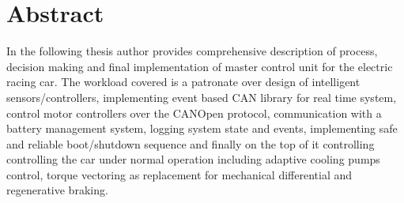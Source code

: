 






\chapter{Abstract}

In the following thesis author provides comprehensive description of process, decision making and final implementation of master control unit for the electric racing car. The workload covered is a patronate over design of intelligent sensors/controllers, implementing event based CAN library for real time system, control motor controllers over the CANOpen protocol, communication with a battery management system, logging system state and events, implementing safe and reliable boot/shutdown sequence and finally on the top of it controlling controlling the car under normal operation including adaptive cooling pumps control, torque vectoring as replacement for mechanical differential and regenerative braking.